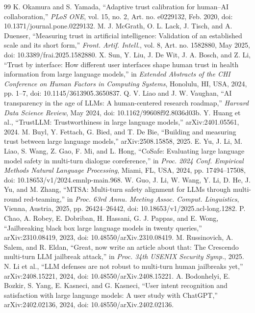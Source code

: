 \documentclass[conference]{IEEEtran}
\begin{document}
\begin{thebibliography}{99}
 K. Okamura and S. Yamada, ``Adaptive trust calibration for human–AI collaboration,'' \textit{PLoS ONE}, vol. 15, no. 2, Art. no. e0229132, Feb. 2020, doi: 10.1371/journal.pone.0229132.
 M. J. McGrath, O. L. Lack, J. Tisch, and A. Duenser, ``Measuring trust in artificial intelligence: Validation of an established scale and its short form,'' \textit{Front. Artif. Intell.}, vol. 8, Art. no. 1582880, May 2025, doi: 10.3389/frai.2025.1582880.
 X. Sun, Y. Liu, J. De Wit, J. A. Bosch, and Z. Li, ``Trust by interface: How different user interfaces shape human trust in health information from large language models,'' in \textit{Extended Abstracts of the CHI Conference on Human Factors in Computing Systems}, Honolulu, HI, USA, 2024, pp. 1–7, doi: 10.1145/3613905.3650837.
 Q. V. Liao and J. W. Vaughan, ``AI transparency in the age of LLMs: A human-centered research roadmap,'' \textit{Harvard Data Science Review}, May 2024, doi: 10.1162/99608f92.8036d03b.
 Y. Huang et al., ``TrustLLM: Trustworthiness in large language models,'' arXiv:2401.05561, 2024.
 M. Buyl, Y. Fettach, G. Bied, and T. De Bie, ``Building and measuring trust between large language models,'' arXiv:2508.15858, 2025.
 E. Yu, J. Li, M. Liao, S. Wang, Z. Gao, F. Mi, and L. Hong, ``CoSafe: Evaluating large language model safety in multi-turn dialogue coreference,'' in \textit{Proc. 2024 Conf. Empirical Methods Natural Language Processing}, Miami, FL, USA, 2024, pp. 17494–17508, doi: 10.18653/v1/2024.emnlp-main.968.
 W. Guo, J. Li, W. Wang, Y. Li, D. He, J. Yu, and M. Zhang, ``MTSA: Multi-turn safety alignment for LLMs through multi-round red-teaming,'' in \textit{Proc. 63rd Annu. Meeting Assoc. Comput. Linguistics}, Vienna, Austria, 2025, pp. 26424–26442, doi: 10.18653/v1/2025.acl-long.1282.
 P. Chao, A. Robey, E. Dobriban, H. Hassani, G. J. Pappas, and E. Wong, ``Jailbreaking black box large language models in twenty queries,'' arXiv:2310.08419, 2023, doi: 10.48550/arXiv.2310.08419.
 M. Russinovich, A. Salem, and R. Eldan, ``Great, now write an article about that: The Crescendo multi-turn LLM jailbreak attack,'' in \textit{Proc. 34th USENIX Security Symp.}, 2025.
 N. Li et al., ``LLM defenses are not robust to multi-turn human jailbreaks yet,'' arXiv:2408.15221, 2024, doi: 10.48550/arXiv.2408.15221.
 A. Bodonhelyi, E. Bozkir, S. Yang, E. Kasneci, and G. Kasneci, ``User intent recognition and satisfaction with large language models: A user study with ChatGPT,'' arXiv:2402.02136, 2024, doi: 10.48550/arXiv.2402.02136.

\end{thebibliography}
\end{document}
